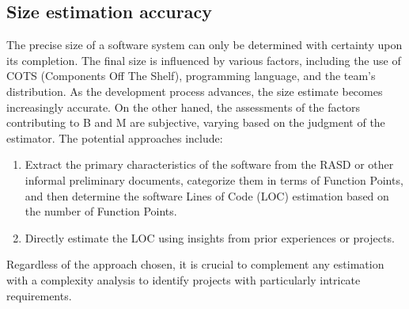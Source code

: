 \subsection{Size estimation accuracy}
The precise size of a software system can only be determined with certainty upon its completion.
The final size is influenced by various factors, including the use of COTS (Components Off The Shelf), programming language, and the team's distribution. 
As the development process advances, the size estimate becomes increasingly accurate. 
On the other haned, the assessments of the factors contributing to B and M are subjective, varying based on the judgment of the estimator.
The potential approaches include:
\begin{enumerate}
    \item Extract the primary characteristics of the software from the RASD or other informal preliminary documents, categorize them in terms of Function Points, and then determine the software Lines of Code (LOC) estimation based on the number of Function Points.
    \item Directly estimate the LOC using insights from prior experiences or projects.
\end{enumerate}
Regardless of the approach chosen, it is crucial to complement any estimation with a complexity analysis to identify projects with particularly intricate requirements.

